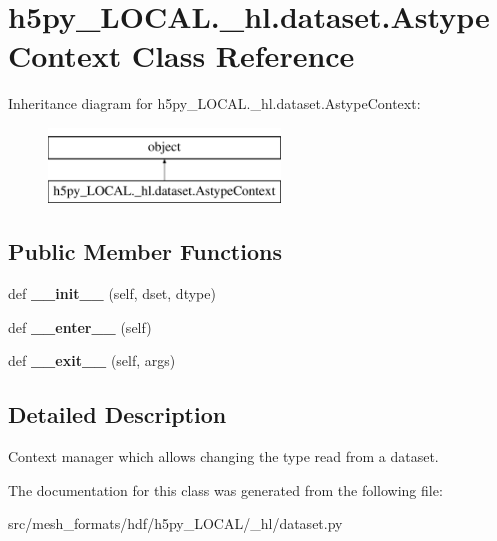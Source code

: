 \hypertarget{classh5py__LOCAL_1_1__hl_1_1dataset_1_1AstypeContext}{}\section{h5py\+\_\+\+L\+O\+C\+A\+L.\+\_\+hl.\+dataset.\+Astype\+Context Class Reference}
\label{classh5py__LOCAL_1_1__hl_1_1dataset_1_1AstypeContext}
Inheritance diagram for h5py\+\_\+\+L\+O\+C\+A\+L.\+\_\+hl.\+dataset.\+Astype\+Context\+:\begin{figure}[H]
\begin{center}
\leavevmode
\includegraphics[height=2.000000cm]{classh5py__LOCAL_1_1__hl_1_1dataset_1_1AstypeContext}
\end{center}
\end{figure}
\subsection*{Public Member Functions}
\begin{DoxyCompactItemize}
\item 
\mbox{\label{classh5py__LOCAL_1_1__hl_1_1dataset_1_1AstypeContext_abf0695c758caf6ceb6a36d0286fadeb6}} 
def {\bfseries \+\_\+\+\_\+init\+\_\+\+\_\+} (self, dset, dtype)
\item 
\mbox{\label{classh5py__LOCAL_1_1__hl_1_1dataset_1_1AstypeContext_a69c5791c4d54e2592191bb95efdda76f}} 
def {\bfseries \+\_\+\+\_\+enter\+\_\+\+\_\+} (self)
\item 
\mbox{\label{classh5py__LOCAL_1_1__hl_1_1dataset_1_1AstypeContext_a77e4dc65149f924f655de5b37dac6d28}} 
def {\bfseries \+\_\+\+\_\+exit\+\_\+\+\_\+} (self, args)
\end{DoxyCompactItemize}


\subsection{Detailed Description}
\begin{DoxyVerb}    Context manager which allows changing the type read from a dataset.
\end{DoxyVerb}
 

The documentation for this class was generated from the following file\+:\begin{DoxyCompactItemize}
\item 
src/mesh\+\_\+formats/hdf/h5py\+\_\+\+L\+O\+C\+A\+L/\+\_\+hl/dataset.\+py\end{DoxyCompactItemize}
